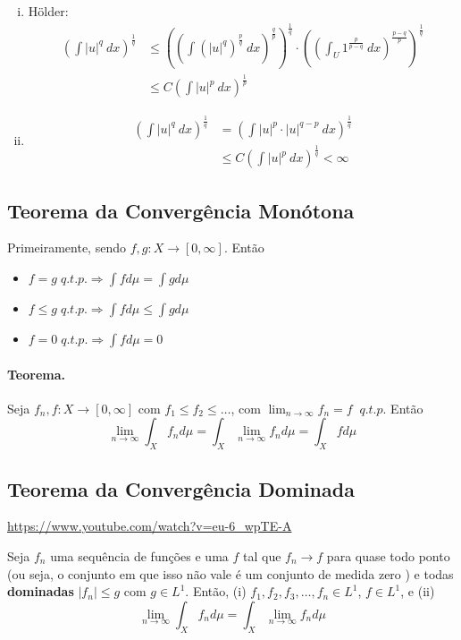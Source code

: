 \documentclass[11pt]{article}
\begin{document}
\begin{enumerate}[(i)]
	\item Hölder:
	\begin{align*}
		\left( \int |u|^q \ dx \right)^{\frac{1}{q}} &\leq \left(\left(\int (|u|^q)^{\frac{p}{q}} \ dx\right)^{\frac{q}{p}}\right)^{\frac{1}{q}}\cdot \left( \left(\int_U 1^{\frac{p}{p-q}} \ dx \right)^{\frac{p-q}{p}}\right)^{\frac{1}{q}} \\
		&\leq C \left( \int |u|^{p} \ dx \right)^{\frac{1}{p}}
	\end{align*}


	\item 
	\begin{align*}
		\left(\int |u|^q\ dx\right)^{\frac{1}{q}} &= \left(\int |u|^p\cdot  |u|^{q-p}\ dx\right)^{\frac{1}{q}} \\
		&\leq C \left(\int |u|^p \ dx \right)^{\frac{1}{q}} < \infty
	\end{align*}
\end{enumerate}

\subsection{Teorema da Convergência Monótona}
Primeiramente, sendo \( f,g: X \rightarrow [0,\infty] \). Então \begin{itemize}
	\item \( f=g \; q.t.p. \Rightarrow \int f d\mu = \int g d\mu \)
	\item \( f \leq g\;  q.t.p. \Rightarrow \int f d\mu \leq \int g d\mu  \)
	\item \( f = 0\;  q.t.p. \Rightarrow \int f d\mu = 0 \)
\end{itemize}

\paragraph{Teorema.} Seja \( f_n, f: X \rightarrow [0, \infty] \) com \( f_1 \leq f_2 \leq \ldots \), com \( \lim_{n \rightarrow \infty} f_n = f \;\; q.t.p. \) Então \[ \lim_{n \rightarrow \infty} \int_X f_n d\mu = \int_X \lim_{n \rightarrow \infty}  f_n d\mu = \int_X f d\mu  \]


\subsection{Teorema da Convergência Dominada}
\url{https://www.youtube.com/watch?v=eu-6_wpTE-A}

Seja \( f_n \) uma sequência de funções e uma \( f \) tal que \( f_n \rightarrow f \) para quase todo ponto (ou seja, o conjunto em que isso não vale é um conjunto de medida zero ) e todas \textbf{dominadas} \( |f_n| \leq g \) com \( g \in L^1 \). Então, (i) \( f_1, f_2, f_3,\ldots,f_n \in L^1 \), \( f \in L^1 \), e (ii)
\[ \lim_{n \rightarrow \infty} \int_X f_n d\mu = \int_X \lim_{n \rightarrow \infty} f_n d\mu  \]
\end{document}
